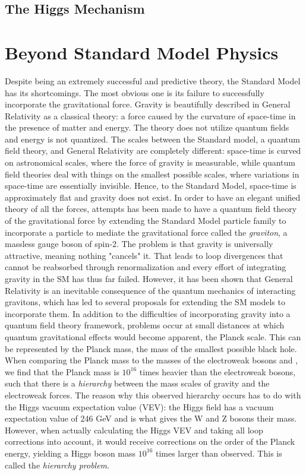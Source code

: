 \subsection{The Higgs Mechanism}
\clearpage

\section{Beyond Standard Model Physics}
Despite being an extremely successful and predictive theory, the Standard Model has its shortcomings. The most obvious one is its failure to successfully incorporate the gravitational force. Gravity is beautifully described in General Relativity as a classical theory: a force caused by the curvature of space-time in the presence of matter and energy. The theory does not utilize quantum fields and energy is not quantized.
The scales between the Standard model, a quantum field theory, and General Relativity are completely different: space-time is curved on astronomical scales, where the force of gravity is measurable, while quantum field theories deal with things on the smallest possible scales, where variations in space-time are essentially invisible. Hence, to the Standard Model, space-time is approximately flat and gravity does not exist. In order to have an elegant unified theory of all the forces, attempts has been made to have a quantum field theory of the gravitational force by extending the Standard Model particle family to incorporate a particle to mediate the gravitational force called the \emph{graviton}, a massless gauge boson of spin-2. The problem is that gravity is universally attractive, meaning nothing "cancels" it. That leads to loop divergences that cannot be reabsorbed through renormalization and every effort of integrating gravity in the SM has thus far failed. However, it has been shown that General Relativity is an inevitable consequence of the quantum mechanics of interacting gravitons, which has led to several proposals for extending the SM models to incorporate them.\newline
In addition to the difficulties of incorporating gravity into a quantum field theory framework, problems occur at small distances at which quantum gravitational effects would become apparent, the Planck scale. This can be represented by the Planck mass, the mass of the smallest possible black hole. When comparing the Planck mass to the masses of the electroweak bosons \PW and \PZ, we find that the Planck mass is $10^{16}$ times heavier than the electroweak bosons, such that there is a \emph{hierarchy} between the mass scales of gravity and the electroweak forces. The reason why this observed hierarchy occurs has to do with the Higgs vacuum expectation value (VEV): the Higgs field has a vacuum expectation value of 246 GeV and is what gives the W and Z bosons their mass. However, when actually calculating the Higgs VEV and taking all loop corrections into account, it would receive corrections on the order of the Planck energy, yielding a Higgs boson mass $10^{16}$ times larger than observed. This is called the \emph{hierarchy problem}.

